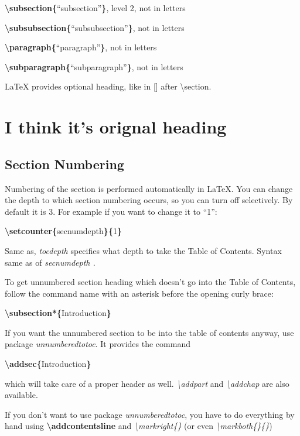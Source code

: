 \documentclass[12pt,a4paper,oneside]{article}
\begin{document}
\textbf{\textbackslash{}subsection\{}``subsection''\textbf{\}}, level 2, not in letters

\textbf{\textbackslash{}subsubsection\{}``subsubsection''\textbf{\}}, not in letters

\textbf{\textbackslash{}paragraph\{}``paragraph''\textbf{\}}, not in letters

\textbf{\textbackslash{}subparagraph\{}``subparagraph''\textbf{\}}, not in letters

{\LaTeX} provides optional heading, like in [] after \textbackslash{}section.

\section[Optional heading]{I think it's orignal heading}

\subsection{Section Numbering}

Numbering of the section is performed automatically in {\LaTeX}. You can change the depth to which section numbering occurs, so you can turn off selectively. By default it is 3. For example if you want to change it to ``1'':

\textbf{\textbackslash{}setcounter\{}secnumdepth\textbf{\}\{}1\textbf{\}}

Same as, \emph{tocdepth} specifies what depth to take the Table of Contents. Syntax same as of \bgroup\em secnumdepth \egroup{}.

To get unnumbered section heading which doesn't go into the Table of Contents, follow the command name with an asterisk before the opening curly brace:

\textbf{\textbackslash{}subsection*\{}Introduction\textbf{\}}

If you want the unnumbered section to be into the table of contents anyway, use package \emph{unnumberedtotoc}. It provides the command

\textbf{\textbackslash{}addsec\{}Introduction\textbf{\}}

which will take care of a proper header as well. \emph{\textbackslash{}addpart} and \emph{\textbackslash{}addchap} are also available.

If you don't want to use package \textit{unnumberedtotoc}, you have to do everything by hand using \textbf{\textbackslash{}addcontentsline} and \emph{\textbackslash{}markright\{\}} (or even \emph{\textbackslash{}markboth\{\}\{\}})
\end{document}
